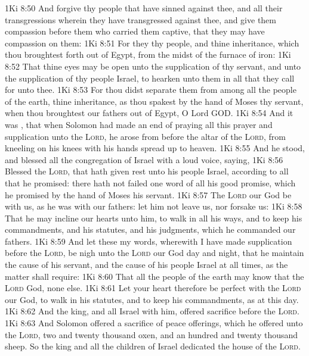 \vs 1Ki 8:50 And forgive thy people that have sinned against thee, and all their transgressions wherein they have transgressed against thee, and give them compassion before them who carried them captive, that they may have compassion on them:
\vs 1Ki 8:51 For they  thy people, and thine inheritance, which thou broughtest forth out of Egypt, from the midst of the furnace of iron:
\vs 1Ki 8:52 That thine eyes may be open unto the supplication of thy servant, and unto the supplication of thy people Israel, to hearken unto them in all that they call for unto thee.
\vs 1Ki 8:53 For thou didst separate them from among all the people of the earth,  thine inheritance, as thou spakest by the hand of Moses thy servant, when thou broughtest our fathers out of Egypt, O Lord GOD.
\vs 1Ki 8:54 And it was , that when Solomon had made an end of praying all this prayer and supplication unto the \textsc{Lord}, he arose from before the altar of the \textsc{Lord}, from kneeling on his knees with his hands spread up to heaven.
\vs 1Ki 8:55 And he stood, and blessed all the congregation of Israel with a loud voice, saying,
\vs 1Ki 8:56 Blessed  the \textsc{Lord}, that hath given rest unto his people Israel, according to all that he promised: there hath not failed one word of all his good promise, which he promised by the hand of Moses his servant.
\vs 1Ki 8:57 The \textsc{Lord} our God be with us, as he was with our fathers: let him not leave us, nor forsake us:
\vs 1Ki 8:58 That he may incline our hearts unto him, to walk in all his ways, and to keep his commandments, and his statutes, and his judgments, which he commanded our fathers.
\vs 1Ki 8:59 And let these my words, wherewith I have made supplication before the \textsc{Lord}, be nigh unto the \textsc{Lord} our God day and night, that he maintain the cause of his servant, and the cause of his people Israel at all times, as the matter shall require:
\vs 1Ki 8:60 That all the people of the earth may know that the \textsc{Lord}  God,  none else.
\vs 1Ki 8:61 Let your heart therefore be perfect with the \textsc{Lord} our God, to walk in his statutes, and to keep his commandments, as at this day.
\vs 1Ki 8:62 And the king, and all Israel with him, offered sacrifice before the \textsc{Lord}.
\vs 1Ki 8:63 And Solomon offered a sacrifice of peace offerings, which he offered unto the \textsc{Lord}, two and twenty thousand oxen, and an hundred and twenty thousand sheep. So the king and all the children of Israel dedicated the house of the \textsc{Lord}.
